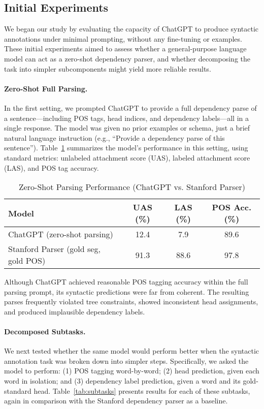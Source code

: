 \subsection{Initial Experiments}
\label{subsec:initial-experiments}

We began our study by evaluating the capacity of ChatGPT to produce syntactic annotations under minimal prompting, without any fine-tuning or examples. These initial experiments aimed to assess whether a general-purpose language model can act as a zero-shot dependency parser, and whether decomposing the task into simpler subcomponents might yield more reliable results.

\paragraph{Zero-Shot Full Parsing.}
In the first setting, we prompted ChatGPT to provide a full dependency parse of a sentence—including POS tags, head indices, and dependency labels—all in a single response. The model was given no prior examples or schema, just a brief natural language instruction (e.g., “Provide a dependency parse of this sentence”). Table~\ref{tab:zeroshot} summarizes the model’s performance in this setting, using standard metrics: unlabeled attachment score (UAS), labeled attachment score (LAS), and POS tag accuracy.

\begin{table}[h]
\centering
\caption{Zero-Shot Parsing Performance (ChatGPT vs. Stanford Parser)}
\label{tab:zeroshot}
\begin{tabular}{lccc}
\toprule
\textbf{Model} & \textbf{UAS (\%)} & \textbf{LAS (\%)} & \textbf{POS Acc. (\%)} \\
\midrule
ChatGPT (zero-shot parsing) & 12.4 & 7.9 & 89.6 \\
Stanford Parser (gold seg, gold POS) & 91.3 & 88.6 & 97.8 \\
\bottomrule
\end{tabular}
\end{table}

Although ChatGPT achieved reasonable POS tagging accuracy within the full parsing prompt, its syntactic predictions were far from coherent. The resulting parses frequently violated tree constraints, showed inconsistent head assignments, and produced implausible dependency labels.

\paragraph{Decomposed Subtasks.}
We next tested whether the same model would perform better when the syntactic annotation task was broken down into simpler steps. Specifically, we asked the model to perform: (1) POS tagging word-by-word; (2) head prediction, given each word in isolation; and (3) dependency label prediction, given a word and its gold-standard head. Table~\ref{tab:subtasks} presents results for each of these subtasks, again in comparison with the Stanford dependency parser as a baseline.

